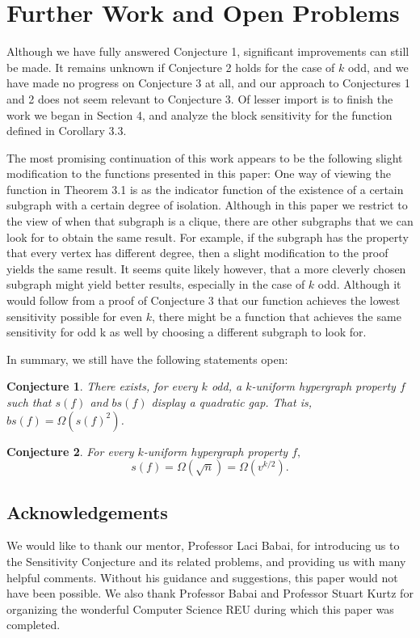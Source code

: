 \documentclass[psamsfonts]{amsart}
\newtheorem*{conj*}{Conjecture}
\theoremstyle{definition}
\theoremstyle{remark}
\numberwithin{equation}{section}
\begin{document}
	\section{Further Work and Open Problems}
		Although we have fully answered Conjecture 1, significant improvements can still be made. It remains unknown if Conjecture 2 holds for the case of $k$ odd, and we have made no progress on Conjecture 3 at all, and our approach to Conjectures 1 and 2 does not seem relevant to Conjecture 3. Of lesser import is to finish the work we began in Section 4, and analyze the block sensitivity for the function defined in Corollary 3.3.

		The most promising continuation of this work appears to be the following slight modification to the functions presented in this paper: One way of viewing the function in Theorem 3.1 is as the indicator function of the existence of a certain subgraph with a certain degree of isolation. Although in this paper we restrict to the view of when that subgraph is a clique, there are other subgraphs that we can look for to obtain the same result. For example, if the subgraph has the property that every vertex has different degree, then a slight modification to the proof yields the same result. It seems quite likely however, that a more cleverly chosen subgraph might yield better results, especially in the case of $k$ odd. Although it would follow from a proof of Conjecture 3 that our function achieves the lowest sensitivity possible for even $k$, there might be a function that achieves the same sensitivity for odd k as well by choosing a different subgraph to look for.
	
	In summary, we still have the following statements open:
	\begin{conj*}
		There exists, for every $k$ odd, a $k$-uniform hypergraph property $f$ such that $s(f)$ and $bs(f)$ display a quadratic gap. That is,  $bs(f)=\Omega(s(f)^2)$.
	\end{conj*}
	
	\begin{conj*}
		For every $k$-uniform hypergraph property $f,$ $$s(f)=\Omega(\sqrt{n})=\Omega(v^{k/2}).$$
	\end{conj*}

	\subsection*{Acknowledgements}
		We would like to thank our mentor, Professor Laci Babai, for introducing us to the Sensitivity Conjecture and its related problems, and providing us with many helpful comments.  Without his guidance and suggestions, this paper would not have been possible.  We also thank Professor Babai and Professor Stuart Kurtz for organizing the wonderful Computer Science REU during which this paper was completed.  
\end{document}

